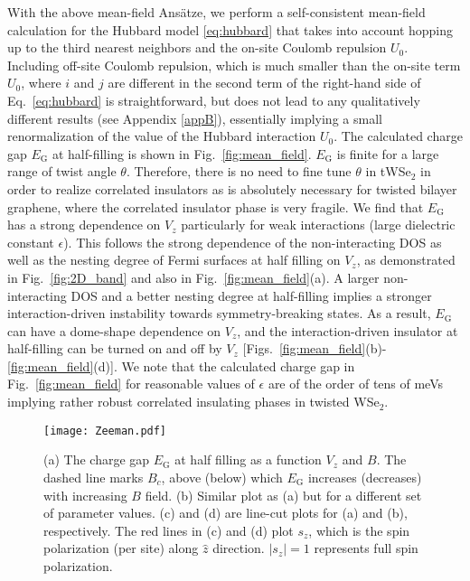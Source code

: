 \documentclass[aps,prx,floatfix,twocolumn]{revtex4-1}
\begin{document}
	With the above mean-field Ans\"atze, we perform a self-consistent mean-field calculation for the Hubbard model \eqref{eq:hubbard} that takes into account hopping up to the third nearest neighbors and the on-site Coulomb repulsion $U_0$. Including off-site Coulomb repulsion, which is much smaller than the on-site term $ U_0 $, where $ i $ and $ j $ are different in the second term of the right-hand side of Eq.~\eqref{eq:hubbard} is straightforward, but does not lead to any qualitatively different results (see Appendix \ref{appB}), essentially implying a small renormalization of the value of the Hubbard interaction $ U_0 $. The calculated charge gap $E_\text{G}$ at half-filling is shown in Fig.~\ref{fig:mean_field}. $E_\text{G}$ is finite for a large range of twist angle $\theta$. Therefore, there is no need to fine tune $\theta$ in tWSe$_2$ in order to realize correlated insulators as is absolutely necessary for twisted bilayer graphene, where the correlated insulator phase is very fragile. We find that $E_\text{G}$ has a strong dependence on $V_z$ particularly for weak interactions (large dielectric constant $\epsilon$). This follows the strong dependence of the non-interacting DOS as well as the nesting degree of Fermi surfaces at half filling on $V_z$, as demonstrated in Fig.~\ref{fig:2D_band} and also in Fig.~\ref{fig:mean_field}(a). A larger non-interacting DOS and a better nesting degree at half-filling implies a stronger interaction-driven instability towards symmetry-breaking states. As a result,  $E_\text{G}$ can have a dome-shape dependence on $V_z$, and the interaction-driven insulator at half-filling can be turned on and off by $V_z$ [Figs.~\ref{fig:mean_field}(b)-\ref{fig:mean_field}(d)]. We note that the calculated charge gap in Fig.~\ref{fig:mean_field} for reasonable values of $\epsilon$ are of the order of tens of meVs implying rather robust correlated insulating phases in twisted WSe$ _2 $.
	
	
	\begin{figure}[t]
		\centering
		\texttt{[image: Zeeman.pdf]}
		\caption{(a) The charge gap $E_\text{G}$ at half filling as a function $V_z$ and $B$. The dashed line marks $B_c$, above (below) which $E_\text{G}$ increases (decreases) with increasing $B$ field. (b) Similar plot as (a) but for a different set of parameter values. (c) and (d) are line-cut plots for (a) and (b), respectively. The red lines in (c) and (d) plot $s_z$, which is the spin polarization (per site) along $\hat{z}$ direction. $|s_z|=1$ represents full spin polarization.}	
		\label{fig:Zeeman}
	\end{figure}		
		
\end{document}
